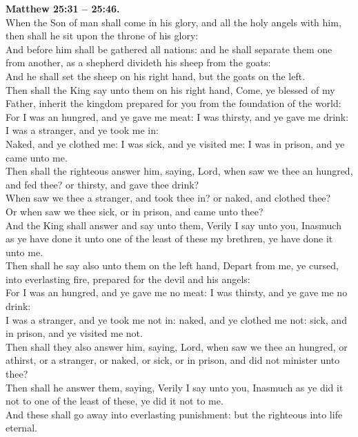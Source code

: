 \documentclass[10pt]{article} %
\begin{document}
{\begin{minipage}[t]{0.45\textwidth}
\textbf{Matthew 25:31 -- 25:46.}\\
When the Son of man shall come in his glory, and all the holy angels with him, then shall he sit upon the throne of his glory:\\
And before him shall be gathered all nations: and he shall separate them one from another, as a shepherd divideth his sheep from the goats:\\
And he shall set the sheep on his right hand, but the goats on the left.\\
Then shall the King say unto them on his right hand, Come, ye blessed of my Father, inherit the kingdom prepared for you from the foundation of the world:\\
For I was an hungred, and ye gave me meat: I was thirsty, and ye gave me drink: I was a stranger, and ye took me in:\\
Naked, and ye clothed me: I was sick, and ye visited me: I was in prison, and ye came unto me.\\
Then shall the righteous answer him, saying, Lord, when saw we thee an hungred, and fed thee? or thirsty, and gave thee drink?\\
When saw we thee a stranger, and took thee in? or naked, and clothed thee?\\
Or when saw we thee sick, or in prison, and came unto thee?\\
And the King shall answer and say unto them, Verily I say unto you, Inasmuch as ye have done it unto one of the least of these my brethren, ye have done it unto me.\\
Then shall he say also unto them on the left hand, Depart from me, ye cursed, into everlasting fire, prepared for the devil and his angels:\\
For I was an hungred, and ye gave me no meat: I was thirsty, and ye gave me no drink:\\
I was a stranger, and ye took me not in: naked, and ye clothed me not: sick, and in prison, and ye visited me not.\\
Then shall they also answer him, saying, Lord, when saw we thee an hungred, or athirst, or a stranger, or naked, or sick, or in prison, and did not minister unto thee?\\
Then shall he answer them, saying, Verily I say unto you, Inasmuch as ye did it not to one of the least of these, ye did it not to me.\\
And these shall go away into everlasting punishment: but the righteous into life eternal.\\

\end{minipage}}
\end{document}
